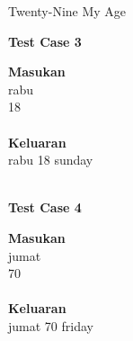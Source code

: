 \begin{permasalahan}{Twenty-Nine My Age}
	\begin{center}
	\textbf{Test Case 3}\\
	\end{center}
	\textbf{Masukan}\\
	rabu \\
	18 \\\\
	\textbf{Keluaran}\\
	rabu 18 sunday\\\\
	
	\begin{center}
	\textbf{Test Case 4}\\
	\end{center}
	\textbf{Masukan}\\
	jumat \\
	70 \\\\
	\textbf{Keluaran}\\
	jumat 70 friday\\	
\end{permasalahan}
